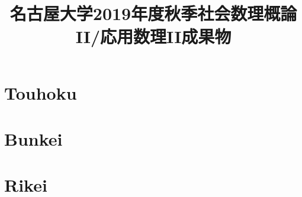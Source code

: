 \documentclass{jsarticle}
\title{名古屋大学2019年度秋季社会数理概論II/応用数理II成果物}
\author{}
\date{}
\numberwithin{equation}{answer}
\begin{document}
\maketitle


\section{Touhoku}



\section{Bunkei}




\section{Rikei}

\end{document}
